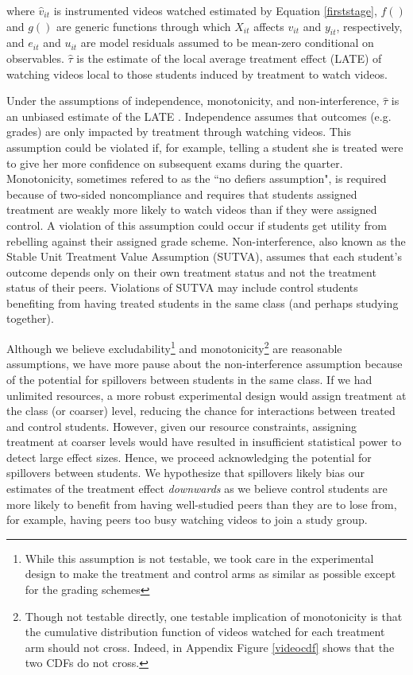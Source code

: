 \documentclass[12pt]{article}
\begin{document}
where $\hat{v}_{it}$ is instrumented videos watched estimated by Equation \ref{firststage}, $f()$ and $g()$ are generic functions through which $X_{it}$ affects $v_{it}$ and $y_{it}$, respectively, and $e_{it}$ and $u_{it}$ are model residuals assumed to be mean-zero conditional on observables. $\hat{\tau}$ is the estimate of the local average treatment effect (LATE) of watching videos local to those students induced by treatment to watch videos.

Under the assumptions of independence, monotonicity, and non-interference, $\hat{\tau}$ is an unbiased estimate of the LATE \parencite{ai1995}. Independence assumes that outcomes (e.g. grades) are only impacted by treatment through watching videos. This assumption could be violated if, for example, telling a student she is treated were to give her more confidence on subsequent exams during the quarter. Monotonicity, sometimes refered to as the ``no defiers assumption", is required because of two-sided noncompliance and requires that students assigned treatment are weakly more likely to watch videos than if they were assigned control. A violation of this assumption could occur if students get utility from rebelling against their assigned grade scheme. Non-interference, also known as the Stable Unit Treatment Value Assumption (SUTVA), assumes that each student's outcome depends only on their own treatment status and not the treatment status of their peers. Violations of SUTVA may include control students benefiting from having treated students in the same class (and perhaps studying together).

Although we believe excludability\footnote{While this assumption is not testable, we took care in the experimental design to make the treatment and control arms as similar as possible except for the grading schemes} and monotonicity\footnote{Though not testable directly, one testable implication of monotonicity is that the cumulative distribution function of videos watched for each treatment arm should not cross. Indeed, in Appendix Figure \ref{videocdf} shows that the two CDFs do not cross.} are reasonable assumptions, we have more pause about the non-interference assumption because of the potential for spillovers between students in the same class. If we had unlimited resources, a more robust experimental design would assign treatment at the class (or coarser) level, reducing the chance for interactions between treated and control students. However, given our resource constraints, assigning treatment at coarser levels would have resulted in insufficient statistical power to detect large effect sizes. Hence, we proceed acknowledging the potential for spillovers between students. We hypothesize that spillovers likely bias our estimates of the treatment effect \textit{downwards} as we believe control students are more likely to benefit from having well-studied peers than they are to lose from, for example, having peers too busy watching videos to join a study group.
\end{document}
